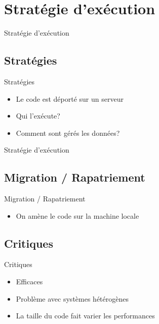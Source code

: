 \def\sectitle{Stratégie d'exécution}
\section{\sectitle}
\begin{frame}{\sectitle}
    \def\subsectitle{Stratégies}
    \subsection{\subsectitle}
    \begin{block}{\subsectitle}
        \begin{itemize}
            \item Le code est déporté sur un serveur
            \item Qui l'exécute?
            \item Comment sont gérés les données?
        \end{itemize}
    \end{block}
\end{frame}
\begin{frame}{\sectitle}
    \def\subsectitle{Migration / Rapatriement}
    \subsection{\subsectitle}
    \begin{block}{\subsectitle}
        \begin{itemize}
            \item On amène le code sur la machine locale
        \end{itemize}
    \end{block}
    \def\subsectitle{Critiques}
    \subsection{\subsectitle}
    \begin{block}{\subsectitle}
        \begin{itemize}
            \item Efficaces
            \item Problème avec systèmes hétérogènes
            \item La taille du code fait varier les performances
        \end{itemize}
    \end{block}
\end{frame}

